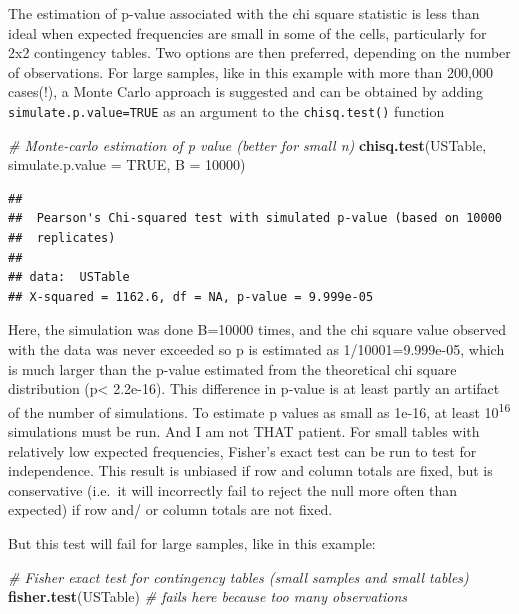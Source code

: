 \documentclass[
  12pt,
]{book}
\newenvironment{Shaded}{\begin{snugshade}}{\end{snugshade}}
\newcommand{\CommentTok}[1]{\textcolor[rgb]{0.56,0.35,0.01}{\textit{#1}}}
\newcommand{\DataTypeTok}[1]{\textcolor[rgb]{0.13,0.29,0.53}{#1}}
\newcommand{\DecValTok}[1]{\textcolor[rgb]{0.00,0.00,0.81}{#1}}
\newcommand{\KeywordTok}[1]{\textcolor[rgb]{0.13,0.29,0.53}{\textbf{#1}}}
\newcommand{\NormalTok}[1]{#1}
\newcommand{\OtherTok}[1]{\textcolor[rgb]{0.56,0.35,0.01}{#1}}
\begin{document}
The estimation of p-value associated with the chi square statistic is less than ideal when expected frequencies are small in some of the cells, particularly for 2x2 contingency tables. Two options are then preferred, depending on the number of observations. For large samples, like in this example with more than 200,000 cases(!), a Monte Carlo approach is suggested and can be obtained by adding \texttt{simulate.p.value=TRUE} as an argument to the \texttt{chisq.test()} function

\begin{Shaded}
\begin{Highlighting}[]
\CommentTok{\# Monte{-}carlo estimation of p value (better for small n)}
\KeywordTok{chisq.test}\NormalTok{(USTable, }\DataTypeTok{simulate.p.value =} \OtherTok{TRUE}\NormalTok{, }\DataTypeTok{B =} \DecValTok{10000}\NormalTok{)}
\end{Highlighting}
\end{Shaded}

\begin{verbatim}
## 
##  Pearson's Chi-squared test with simulated p-value (based on 10000
##  replicates)
## 
## data:  USTable
## X-squared = 1162.6, df = NA, p-value = 9.999e-05
\end{verbatim}

Here, the simulation was done B=10000 times, and the chi square value observed with the data was never exceeded so p is estimated as 1/10001=9.999e-05, which is much larger than the p-value estimated from the theoretical chi square distribution (p\textless{} 2.2e-16). This difference in p-value is at least partly an artifact of the number of simulations. To estimate p values as small as 1e-16, at least 10\textsuperscript{16} simulations must be run. And I am not THAT patient. For small tables with relatively low expected frequencies, Fisher's exact test can be run to test for independence. This result is unbiased if row and column totals are fixed, but is conservative (i.e.~it will incorrectly fail to reject the null more often than expected) if row and/ or column totals are not fixed.

But this test will fail for large samples, like in this example:

\begin{Shaded}
\begin{Highlighting}[]
\CommentTok{\# Fisher exact test for contingency tables (small samples and small tables)}
\KeywordTok{fisher.test}\NormalTok{(USTable) }\CommentTok{\# fails here because too many observations}
\end{Highlighting}
\end{Shaded}
\end{document}

